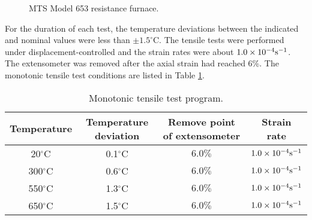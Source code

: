 
\begin{figure}[!htp]
\caption{MTS Model 653 resistance furnace.}
\label{Fig:Furnace653_1}
\end{figure}

For the duration of each test, the temperature deviations between the indicated and nominal values were less than $\pm1.5^{\circ}$C.
The tensile tests were performed under displacement-controlled and the strain rates were about $1.0\times 10^{-4}\rm{s}^{-1}$.
The extensometer was removed after the axial strain had reached 6\%.
The monotonic tensile test conditions are listed in Table \ref{tab:TensionLoadingConditions}.
\begin{table}[htbp]
  \centering
  \caption{Monotonic tensile test program.}
    \begin{tabular}{cccc}
    \toprule
    Temperature & Temperature deviation & Remove point of extensometer  & Strain rate  \\
    \midrule
    20$^{\circ}$C  & 0.1$^{\circ}$C & $6.0\%$ & $1.0\times 10^{-4} \rm{s}^{-1}$ \\
    300$^{\circ}$C & 0.6$^{\circ}$C & $6.0\%$ & $1.0\times 10^{-4} \rm{s}^{-1}$ \\
    550$^{\circ}$C & 1.3$^{\circ}$C & $6.0\%$ & $1.0\times 10^{-4} \rm{s}^{-1}$ \\
    650$^{\circ}$C & 1.5$^{\circ}$C & $6.0\%$ & $1.0\times 10^{-4} \rm{s}^{-1}$ \\
    \bottomrule
    \end{tabular}%
  \label{tab:TensionLoadingConditions}%
\end{table}%

